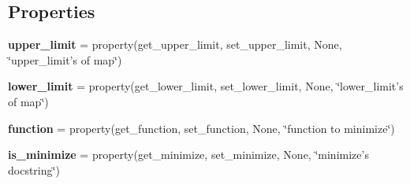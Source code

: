 \subsection*{Properties}
\begin{DoxyCompactItemize}
\item 
\hypertarget{classsrc_1_1common__entities_1_1terrain_1_1Terrain_a499478b6282d241d9a12a451059de50b}{
{\bfseries upper\_\-limit} = property(get\_\-upper\_\-limit, set\_\-upper\_\-limit, None, \char`\"{}upper\_\-limit's of map\char`\"{})}
\label{classsrc_1_1common__entities_1_1terrain_1_1Terrain_a499478b6282d241d9a12a451059de50b}

\item 
\hypertarget{classsrc_1_1common__entities_1_1terrain_1_1Terrain_ae9ce4fd6af189b1bf3a9c103dcba4ddb}{
{\bfseries lower\_\-limit} = property(get\_\-lower\_\-limit, set\_\-lower\_\-limit, None, \char`\"{}lower\_\-limit's of map\char`\"{})}
\label{classsrc_1_1common__entities_1_1terrain_1_1Terrain_ae9ce4fd6af189b1bf3a9c103dcba4ddb}

\item 
\hypertarget{classsrc_1_1common__entities_1_1terrain_1_1Terrain_a1988253e790ba56a2cdb1b73c1be98ea}{
{\bfseries function} = property(get\_\-function, set\_\-function, None, \char`\"{}function to minimize\char`\"{})}
\label{classsrc_1_1common__entities_1_1terrain_1_1Terrain_a1988253e790ba56a2cdb1b73c1be98ea}

\item 
\hypertarget{classsrc_1_1common__entities_1_1terrain_1_1Terrain_a42a4bbb38d2620ba6410ddf2b1363429}{
{\bfseries is\_\-minimize} = property(get\_\-minimize, set\_\-minimize, None, \char`\"{}minimize's docstring\char`\"{})}
\label{classsrc_1_1common__entities_1_1terrain_1_1Terrain_a42a4bbb38d2620ba6410ddf2b1363429}

\end{DoxyCompactItemize}


